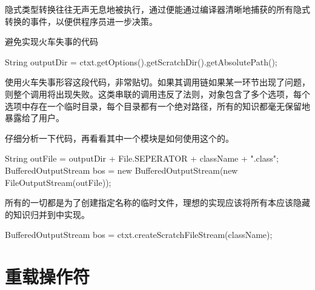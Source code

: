 \begin{content}
隐式类型转换往往无声无息地被执行，通过便能通过编译器清晰地捕获的所有隐式转换的事件，以便供程序员进一步决策。

\begin{regulation}
避免实现火车失事的代码
\end{regulation}

\begin{leftbar}
\begin{java}
String outputDir = ctxt.getOptions().getScratchDir().getAbsolutePath();
\end{java}
\end{leftbar}

使用火车失事形容这段代码，非常贴切。如果其调用链如果某一环节出现了问题，则整个调用将出现失败。这类串联的调用违反了法则，对象包含了多个选项，每个选项中存在一个临时目录，每个目录都有一个绝对路径，所有的知识都毫无保留地暴露给了用户。

仔细分析一下代码，再看看其中一个模块是如何使用这个的。

\begin{leftbar}
\begin{java}
String outFile = outputDir + File.SEPERATOR + className + ".class";
BufferedOutputStream bos = new BufferedOutputStream(new FileOutputStream(outFile));
\end{java}
\end{leftbar}

所有的一切都是为了创建指定名称的临时文件，理想的实现应该将所有本应该隐藏的知识归并到中实现。

\begin{leftbar}
\begin{c++}
BufferedOutputStream bos = ctxt.createScratchFileStream(className);
\end{c++}
\end{leftbar}

\end{content}

\section{重载操作符}

